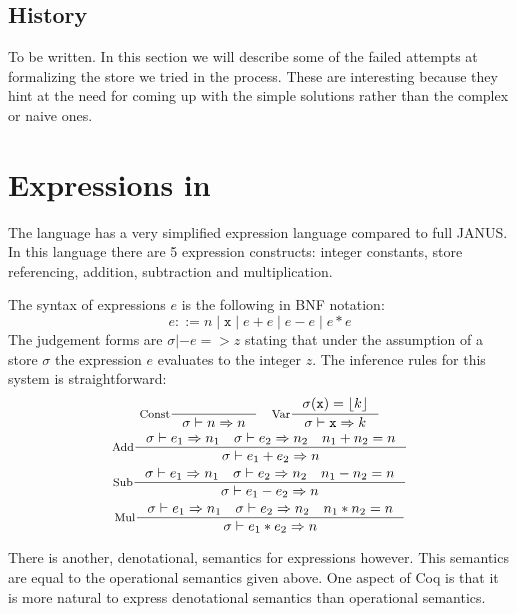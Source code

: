 \subsection{History}

To be written. In this section we will describe some of the failed
attempts at formalizing the store we tried in the process. These are
interesting because they hint at the need for coming up with the
simple solutions rather than the complex or naive ones.


\section{Expressions in \janusz{}}

The \janusz{} language has a very simplified expression language
compared to full JANUS. In this language there are 5 expression
constructs: integer constants, store referencing, addition,
subtraction and multiplication.

The syntax of expressions $e$ is the following in BNF notation:
\newcommand{\bor}{\; | \;}
\begin{equation*}
  e ::= n \bor \mathtt{x} \bor e + e \bor e - e \bor e * e
\end{equation*}
The judgement forms are $\sigma |- e => z$ stating that under the
assumption of a store $\sigma$ the expression $e$ evaluates to the
integer $z$. The inference rules for this system is straightforward:
\begin{gather*}
  \inference[Const]{}{\sigma |- n => n} \quad \inference[Var]{\sigma(\mathtt{x}) =
    \lift{k}}{\sigma |- \mathtt{x} => k} \\
  \inference[Add]{\sigma |- e_1 => n_1 \quad \sigma |- e_2 => n_2 \quad
    n_1 + n_2 = n}{\sigma |- e_1 + e_2 => n} \\
  \inference[Sub]{\sigma |- e_1 => n_1 \quad \sigma |- e_2 => n_2 \quad
    n_1 - n_2 = n}{\sigma |- e_1 - e_2 => n} \\
  \inference[Mul]{\sigma |- e_1 => n_1 \quad \sigma |- e_2 => n_2 \quad
    n_1 * n_2 = n}{\sigma |- e_1 * e_2 => n}
\end{gather*}

There is another, denotational, semantics for expressions
however. This semantics are equal to the operational semantics given
above. One aspect of Coq is that it is more natural to express
denotational semantics than operational semantics.

